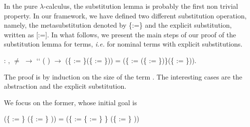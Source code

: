  In the pure $\lambda$-calculus, the substitution lemma is probably the first non trivial property. In our framework, we have defined two different substitution operation, namely, the metasubstitution denoted by \{:=\} and the explicit substitution, written as [:=]. In what follows, we present the main steps of our proof of the substitution lemma for  terms, {\it i.e.} for nominal terms with explicit substitutions. 
\begin{coqdoccode}
\coqdocemptyline
\coqdocnoindent
{} : \coqdockw{\ensuremath{\forall}}     ,  \ensuremath{\not=}  \ensuremath{\rightarrow}  `` ( ) \ensuremath{\rightarrow}\coqdoceol
\coqdocindent{10.50em}
(\{ := \}(\{ := \})) = (\{ := (\{ := \})\}(\{ := \})).\coqdoceol
\end{coqdoccode}
 The proof is by induction on the size of the term . The interesting cases are the abstraction and the explicit substitution.
\begin{coqdoccode}
\end{coqdoccode}
We focus on the former, whose initial goal is


(\{ := \} (\{ := \}   )) = (\{ := \{ := \} \} (\{ := \}   ))


